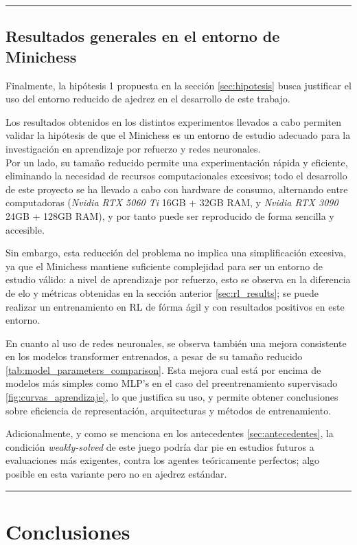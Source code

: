\documentclass[12pt, a4paper]{article}
\begin{document}
\rule{\textwidth}{0.2pt}
\subsection{Resultados generales en el entorno de Minichess} \label{sec:general_results}

Finalmente, la hipótesis 1 propuesta en la sección \ref{sec:hipotesis} busca justificar el uso del entorno reducido de ajedrez en el desarrollo de este trabajo.  

Los resultados obtenidos en los distintos experimentos llevados a cabo permiten validar la hipótesis de que el Minichess es un entorno de estudio adecuado para la investigación en aprendizaje por refuerzo y redes neuronales. \\
Por un lado, su tamaño reducido permite una experimentación rápida y eficiente, eliminando la necesidad de recursos computacionales excesivos; todo el desarrollo de este proyecto se ha llevado a cabo con hardware de consumo, alternando entre computadoras (\textit{Nvidia RTX 5060 Ti} 16GB + 32GB RAM, y \textit{Nvidia RTX 3090} 24GB + 128GB RAM), y por tanto puede ser reproducido de forma sencilla y accesible.

Sin embargo, esta reducción del problema no implica una simplificación excesiva, ya que el Minichess mantiene suficiente complejidad para ser un entorno de estudio válido: a nivel de aprendizaje por refuerzo, esto se observa en la diferencia de elo y métricas obtenidas en la sección anterior \ref{sec:rl_results}; se puede realizar un entrenamiento en RL de fórma ágil y con resultados positivos en este entorno.

En cuanto al uso de redes neuronales, se observa también una mejora consistente en los modelos transformer entrenados, a pesar de su tamaño reducido \ref{tab:model_parameters_comparison}. Esta mejora cual está por encima de modelos más simples como MLP's en el caso del preentrenamiento supervisado \ref{fig:curvas_aprendizaje}, lo que justifica su uso, y permite obtener conclusiones sobre eficiencia de representación, arquitecturas y métodos de entrenamiento.

Adicionalmente, y como se menciona en los antecedentes \ref{sec:antecedentes}, la condición \textit{weakly-solved} de este juego podría dar pie en estudios futuros a evaluaciones más exigentes, contra los agentes teóricamente perfectos; algo posible en esta variante pero no en ajedrez estándar.

\rule{\textwidth}{0.2pt}
\section{Conclusiones}\label{sec:conclusiones}
\end{document}
